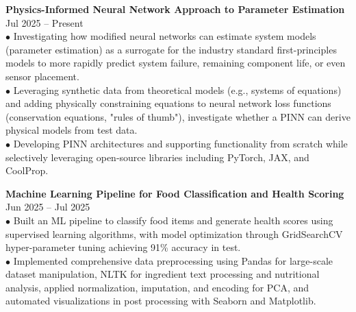 \documentclass[10pt]{article}
\newcommand{\blankline}{\quad\pagebreak[2]\vspace{-0.3\baselineskip}}
\begin{document}
\blankline

\textbf{Physics-Informed Neural Network Approach to Parameter Estimation}
\hfill Jul 2025 -- Present \\
$\bullet$ Investigating how modified neural networks can estimate system models (parameter estimation) as a surrogate for the industry standard first-principles models to more rapidly predict system failure, remaining component life, or even sensor placement. \\
$\bullet$ Leveraging synthetic data from theoretical models (e.g., systems of equations) and adding physically constraining equations to neural network loss functions (conservation equations, "rules of thumb"), investigate whether a PINN can derive physical models from test data. \\
$\bullet$ Developing PINN architectures and supporting functionality from scratch while selectively leveraging open-source libraries including PyTorch, JAX, and CoolProp.

\blankline

\textbf{Machine Learning Pipeline for Food Classification and Health Scoring}
\hfill Jun 2025 -- Jul 2025 \\ 
$\bullet$ Built an ML pipeline to classify food items and generate health scores using supervised learning algorithms, with model optimization through GridSearchCV hyper-parameter tuning achieving 91\% accuracy in test. \\
$\bullet$ Implemented comprehensive data preprocessing using Pandas for large-scale dataset manipulation, NLTK for ingredient text processing and nutritional analysis, applied normalization, imputation, and encoding for PCA, and automated visualizations in post processing with Seaborn and Matplotlib.

\blankline

\end{document}
